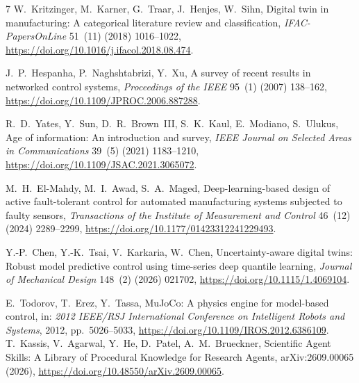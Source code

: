 \begin{thebibliography}{7}
W.~Kritzinger, M.~Karner, G.~Traar, J.~Henjes, W.~Sihn,
Digital twin in manufacturing: A categorical literature review and classification,
\emph{IFAC-PapersOnLine} 51~(11) (2018) 1016--1022,
\url{https://doi.org/10.1016/j.ifacol.2018.08.474}.

J.~P.~Hespanha, P.~Naghshtabrizi, Y.~Xu,
A survey of recent results in networked control systems,
\emph{Proceedings of the IEEE} 95~(1) (2007) 138--162,
\url{https://doi.org/10.1109/JPROC.2006.887288}.

R.~D.~Yates, Y.~Sun, D.~R.~Brown~III, S.~K.~Kaul, E.~Modiano, S.~Ulukus,
Age of information: An introduction and survey,
\emph{IEEE Journal on Selected Areas in Communications} 39~(5) (2021) 1183--1210,
\url{https://doi.org/10.1109/JSAC.2021.3065072}.

M.~H.~El-Mahdy, M.~I.~Awad, S.~A.~Maged,
Deep-learning-based design of active fault-tolerant control for automated manufacturing systems subjected to faulty sensors,
\emph{Transactions of the Institute of Measurement and Control} 46~(12) (2024) 2289--2299,
\url{https://doi.org/10.1177/01423312241229493}.

Y.-P.~Chen, Y.-K.~Tsai, V.~Karkaria, W.~Chen,
Uncertainty-aware digital twins: Robust model predictive control using time-series deep quantile learning,
\emph{Journal of Mechanical Design} 148~(2) (2026) 021702,
\url{https://doi.org/10.1115/1.4069104}.

E.~Todorov, T.~Erez, Y.~Tassa,
MuJoCo: A physics engine for model-based control,
in: \emph{2012 IEEE/RSJ International Conference on Intelligent Robots and Systems},
2012, pp.~5026--5033,
\url{https://doi.org/10.1109/IROS.2012.6386109}.
T.~Kassis, V.~Agarwal, Y.~He, D.~Patel, A.~M.~Brueckner,
Scientific Agent Skills: A Library of Procedural Knowledge for Research Agents,
arXiv:2609.00065 (2026), \url{https://doi.org/10.48550/arXiv.2609.00065}.
\end{thebibliography}
